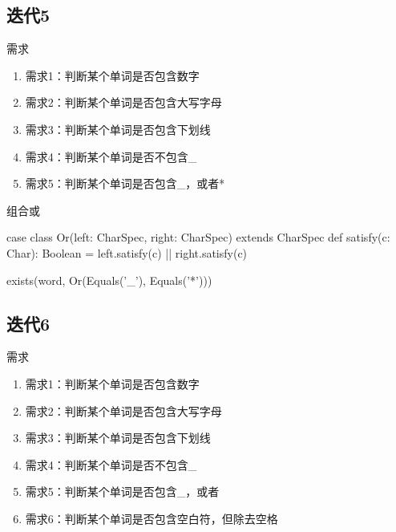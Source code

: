 \subsection{迭代5}

\begin{frame}{需求}
  \begin{block}{}
    \begin{enumerate}
    \item \alert{需求1}：判断某个单词是否包含数字
    \item \alert{需求2}：判断某个单词是否包含大写字母
    \item \alert{需求3}：判断某个单词是否包含下划线 
    \item \alert{需求4}：判断某个单词是否不包含\_
    \item \alert{需求5}：判断某个单词是否包含\_，或者*   
    \end{enumerate}
  \end{block}
\end{frame}

\begin{frame}[fragile]{组合或}
  \begin{scala}
case class Or(left: CharSpec, right: CharSpec) extends CharSpec {
  def satisfy(c: Char): Boolean = 
    left.satisfy(c) || right.satisfy(c)
}

exists(word, Or(Equals('_'), Equals('*')))
  \end{scala}
\end{frame}

\subsection{迭代6}

\begin{frame}{需求}
  \begin{block}{}
    \begin{enumerate}
    \item \alert{需求1}：判断某个单词是否包含数字
    \item \alert{需求2}：判断某个单词是否包含大写字母
    \item \alert{需求3}：判断某个单词是否包含下划线 
    \item \alert{需求4}：判断某个单词是否不包含\_
    \item \alert{需求5}：判断某个单词是否包含\_，或者\*     
    \item \alert{需求6}：判断某个单词是否包含空白符，但除去空格     
    \end{enumerate}
  \end{block}
\end{frame}

